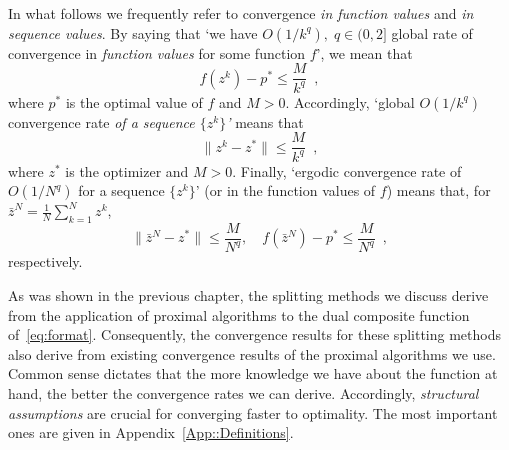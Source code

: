 \documentclass[openany]{now}
\begin{document}
In what follows we frequently refer to convergence \emph{in function values} and \emph{in sequence values}. By saying that `we have $O(1/k^q), \; q\in (0,2]$ global rate of convergence in \emph{function values} for some function $f$', we mean that
 \[
  f(z^k)-p^\ast \le \frac{M}{k^q}\enspace,
 \]
 where $p^\ast$ is the optimal value of $f$ and $M>0$. 
 Accordingly, `global $O(1/k^q)$ convergence rate \emph{of a sequence $\{z^k\}$'} means that
 \[
 \|z^k-z^\ast\| \le \frac{M}{k^q}\enspace,
 \]
 where $z^\ast$ is the optimizer and $M>0$.
 Finally, `ergodic convergence rate of $O(1/N^q)$ for a sequence $\{z^k\}$' (or in the function values of $f$) means that, for $\bar{z}^N = \frac{1}{N}\sum_{k=1}^Nz^k$,
 \[
 \|\bar{z}^N-z^\ast\| \le \frac{M}{N^q}, \quad f(\bar{z}^N)-p^\ast \le \frac{M}{N^q}\enspace,
 \] 
 respectively.

As was shown in the previous chapter, the splitting methods we discuss derive from the application of proximal algorithms to the dual composite function of~\eqref{eq:format}. Consequently, the convergence results for these splitting methods also derive from existing convergence results of the proximal algorithms we use. Common sense dictates that the more knowledge we have about the function at hand, the better the convergence rates we can derive. Accordingly, \emph{structural assumptions} are crucial for converging faster to optimality. The most important ones are given in Appendix~\ref{App::Definitions}.
\end{document}
